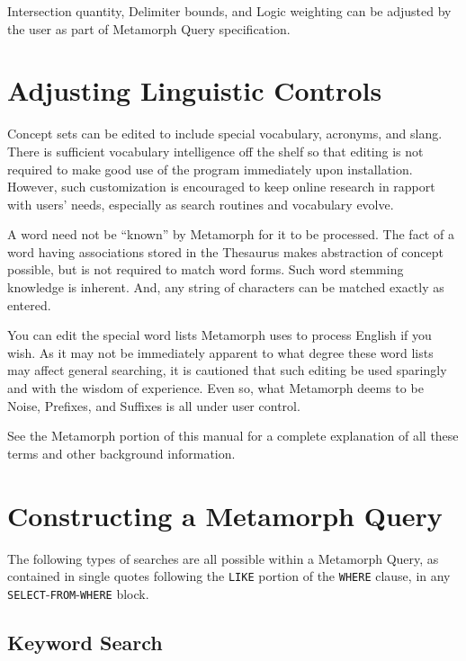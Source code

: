 Intersection quantity, Delimiter bounds, and Logic weighting can be
adjusted by the user as part of Metamorph Query specification.

\section{Adjusting Linguistic Controls}

Concept sets can be edited to include special vocabulary, acronyms,
and slang.  There is sufficient vocabulary intelligence off the shelf
so that editing is not required to make good use of the program
immediately upon installation.  However, such customization is
encouraged to keep online research in rapport with users' needs,
especially as search routines and vocabulary evolve.

A word need not be ``known'' by Metamorph for it to be processed.  The
fact of a word having associations stored in the Thesaurus makes
abstraction of concept possible, but is not required to match word
forms.  Such word stemming knowledge is inherent.  And, any string of
characters can be matched exactly as entered.

You can edit the special word lists Metamorph uses to process English
if you wish.  As it may not be immediately apparent to what degree
these word lists may affect general searching, it is cautioned that
such editing be used sparingly and with the wisdom of experience.
Even so, what Metamorph deems to be Noise, Prefixes, and Suffixes is
all under user control.

See the Metamorph portion of this manual for a complete explanation
of all these terms and other background information.

\section{Constructing a Metamorph Query}

The following types of searches are all possible within a Metamorph
Query, as contained in single quotes following the \verb`LIKE` portion of the
\verb`WHERE` clause, in any \verb`SELECT`-\verb`FROM`-\verb`WHERE` block.

\subsection{Keyword Search}

